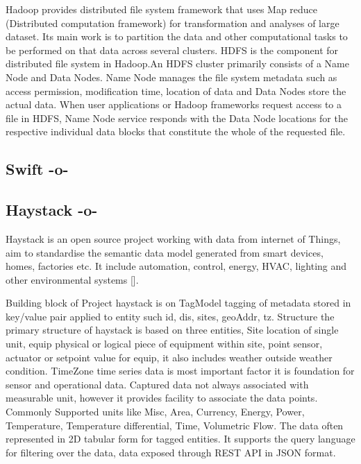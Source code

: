 Hadoop provides distributed file system framework that uses Map reduce
(Distributed computation framework) for transformation and analyses of
large dataset.  Its main work is to partition the data and other
computational tasks to be performed on that data across several
clusters.  HDFS is the component for distributed file system in
Hadoop.An HDFS cluster primarily consists of a Name Node and Data
Nodes. Name Node manages the file system metadata such as access
permission, modification time, location of data and Data Nodes store
the actual data.  When user applications or Hadoop frameworks request
access to a file in HDFS, Name Node service responds with the Data
Node locations for the respective individual data blocks that
constitute the whole of the requested file\cite{www-hdfs}.

\subsection{Swift -o-}



\subsection{Haystack -o-}

Haystack is an open source project working with data from internet of
Things, aim to standardise the semantic data model generated from
smart devices, homes, factories etc.  It include automation, control,
energy, HVAC, lighting and other environmental systems
 [\cite{www-project-haystack}].
     
Building block of Project haystack is on TagModel tagging of metadata
stored in key/value pair applied to entity such id, dis, sites,
geoAddr, tz. Structure the primary structure of haystack is based on
three entities, Site location of single unit, equip physical or
logical piece of equipment within site, point sensor, actuator or
setpoint value for equip, it also includes weather outside weather
condition. TimeZone time series data is most important factor it is
foundation for sensor and operational data. Captured data not always
associated with measurable unit, however it provides facility to
associate the data points.  Commonly Supported units like Misc, Area,
Currency, Energy, Power, Temperature, Temperature differential, Time,
Volumetric Flow. The data often represented in 2D tabular form for
tagged entities. It supports the query language for filtering over the
data, data exposed through REST API in JSON format.




